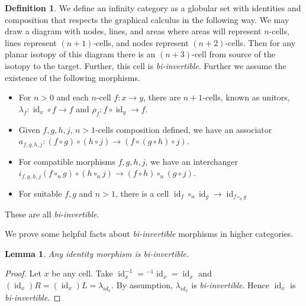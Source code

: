 \documentclass{article}
\newtheorem{lemma}{Lemma}
\theoremstyle{definition}
\newtheorem{definition}{Definition}
\theoremstyle{examplestyle}
\DeclareMathOperator{\id}{id}
\newcommand{\linv}[1]{{}^{-1}\!#1}
\newcommand{\rinv}[1]{#1^{-1}}
\begin{document}
\begin{definition}
  \label{def:higher-cat}
  We define an infinity category as a globular set with identities and composition that respects the graphical calculus in the following way. We may draw a diagram with nodes, lines, and areas where areas will represent \(n\)-cells, lines represent \((n+1)\)-cells, and nodes represent \((n+2)\)-cells. Then for any planar isotopy of this diagram there is an \((n+3)\)-cell from source of the isotopy to the target. Further, this cell is \emph{bi-invertible}. Further we assume the existence of the following morphisms.
  \begin{itemize}
  \item For \(n>0\) and each \(n\)-cell \(f: x \to y\), there are \(n+1\)-cells, known as unitors, \(\lambda_f: \id_x \circ f \to f\) and \(\rho_f: f \circ \id_y \to f\).
  \item Given \(f,g,h,j\), \(n>1\)-cells composition defined, we have an associator \(a_{f,g,h,j} : (f \circ g) \circ (h \circ j) \to (f \circ (g \circ h) \circ j)\).
  \item For compatible morphisms \(f,g,h,j\), we have an interchanger \(i_{f,g,h,j}(f \circ_n g) \circ (h \circ_n j) \to (f \circ h) \circ_n (g \circ j)\).
  \item For suitable \(f,g\) and \(n > 1\), there is a cell \(\id_f \circ_n \id_g \to \id_{f \circ_n g}\)
  \end{itemize}
  These are all \emph{bi-invertible}.
\end{definition}

We prove some helpful facts about \emph{bi-invertible} morphisms in higher categories.

\begin{lemma}
  \label{lem:identity}
  Any identity morphism is \emph{bi-invertible}.
\end{lemma}

\begin{proof}
  Let \(x\) be any cell. Take \(\rinv {\id_x} = \linv {\id_x} = \id_x\) and \((\id_x)R = (\id_x)L = \lambda_{id_x}\). By assumption, \(\lambda_{id_x}\) is \emph{bi-invertible}. Hence \(\id_x\) is \emph{bi-invertible}.
\end{proof}
\end{document}
